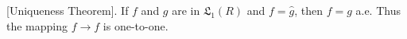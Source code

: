 [Uniqueness Theorem]. If $f$ and $g$ are in $\mathfrak{L}_1(R)$ and $f = \hat{g}$, then $f = g$ a.e. Thus the mapping $f \rightarrow f$ is one-to-one.